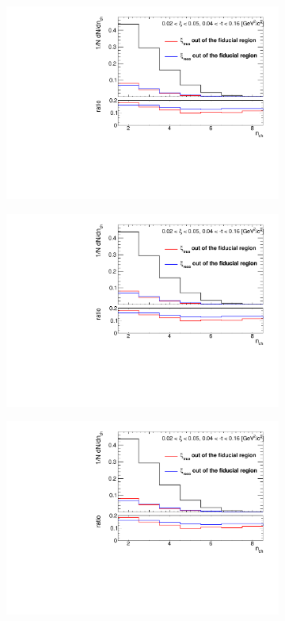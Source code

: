 \begin{figure}[h!]
	\centering
	\begin{subfigure}{.49\textwidth}
		\includegraphics[width=\textwidth,page=4]{chapters/chrgSTAR/img/xiMigration/xi.pdf}
	\end{subfigure}
	\begin{subfigure}{.49\textwidth}
		\includegraphics[width=\textwidth,page=5]{chapters/chrgSTAR/img/xiMigration/xi.pdf}
	\end{subfigure}
	\begin{subfigure}{.49\textwidth}
		\includegraphics[width=\textwidth,page=6]{chapters/chrgSTAR/img/xiMigration/xi.pdf}

\end{subfigure}
\end{figure}
